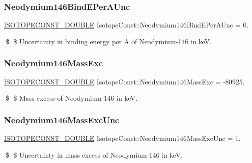 \subsubsection{\texorpdfstring{Neodymium146\+Bind\+E\+Per\+A\+Unc}{Neodymium146BindEPerAUnc}}
{\footnotesize\ttfamily \mbox{\hyperlink{group___isotope_const-_macros_ga8f45a7272ce02c0b4c65c44636ed719a}{I\+S\+O\+T\+O\+P\+E\+C\+O\+N\+S\+T\+\_\+\+D\+O\+U\+B\+LE}} Isotope\+Const\+::\+Neodymium146\+Bind\+E\+Per\+A\+Unc = 0.}

\$ \$ Uncertainty in binding energy per A of Neodymium-\/146 in keV. \mbox{\label{group___isotope_const-_neodymium-_nd146_ga1db374dc4f7d1e57b5835d139591febb}} 
\subsubsection{\texorpdfstring{Neodymium146\+Mass\+Exc}{Neodymium146MassExc}}
{\footnotesize\ttfamily \mbox{\hyperlink{group___isotope_const-_macros_ga8f45a7272ce02c0b4c65c44636ed719a}{I\+S\+O\+T\+O\+P\+E\+C\+O\+N\+S\+T\+\_\+\+D\+O\+U\+B\+LE}} Isotope\+Const\+::\+Neodymium146\+Mass\+Exc = -\/80925.}

\$ \$ Mass excess of Neodymium-\/146 in keV. \mbox{\label{group___isotope_const-_neodymium-_nd146_ga34d9c854ba72c7c3426de9d8b010bc96}} 
\subsubsection{\texorpdfstring{Neodymium146\+Mass\+Exc\+Unc}{Neodymium146MassExcUnc}}
{\footnotesize\ttfamily \mbox{\hyperlink{group___isotope_const-_macros_ga8f45a7272ce02c0b4c65c44636ed719a}{I\+S\+O\+T\+O\+P\+E\+C\+O\+N\+S\+T\+\_\+\+D\+O\+U\+B\+LE}} Isotope\+Const\+::\+Neodymium146\+Mass\+Exc\+Unc = 1.}

\$ \$ Uncertainty in mass excess of Neodymium-\/146 in keV. \mbox{\label{group___isotope_const-_neodymium-_nd146_ga0d11a73debe8e95ddf4c01eb3d24c1e8}} 
